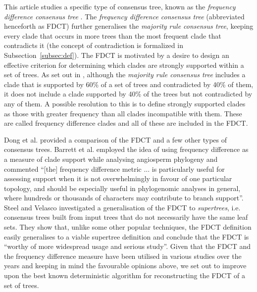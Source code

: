 \documentclass{article}
\begin{document}
    This article studies a specific type of consensus tree, known as the \textit{frequency difference consensus tree} \cite{goloboff2003improvements}. The \textit{frequency difference consensus tree} (abbreviated henceforth as FDCT) further generalises the \textit{majority rule consensus tree}, keeping every clade that occurs in more trees than the most frequent clade that contradicts it (the concept of contradiction is formalized in Subsection~\ref{subsec:def}). The FDCT is motivated by a desire to design an effective criterion for determining which clades are strongly supported within a set of trees. As set out in \cite{goloboff2003improvements}, although the \textit{majority rule consensus tree} includes a clade that is supported by 60\% of a set of trees and contradicted by 40\% of them, it does not include a clade supported by 40\% of the trees but not contradicted by any of them. A possible resolution to this is to define strongly supported clades as those with greater frequency than all clades incompatible with them. These are called frequency difference clades and all of these are included in the FDCT.

    Dong et al. \cite{dong2010majority} provided a comparison of the FDCT and a few other types of consensus trees. Barrett et al. \cite{barrett2013plastid} employed the idea of using frequency difference as a measure of clade support while analysing angiosperm phylogeny and commented ``[the] frequency difference metric ... is particularly useful for assessing support when it is not overwhelmingly in favour of one particular topology, and should be especially useful in phylogenomic analyses in general, where hundreds or thousands of characters may contribute to branch support''. Steel and Velasco \cite{steel2014axiomatic} investigated a generalisation of the FDCT to \textit{supertrees}, i.e. consensus trees built from input trees that do not necessarily have the same leaf sets. They show that, unlike some other popular techniques, the FDCT definition easily generalises to a viable supertree definition and conclude that the FDCT is ``worthy of more widespread usage and serious study''. Given that the FDCT and the frequency difference measure have been utilised in various studies over the years \cite{garcia2014testing,barrett2013plastid,molineri2010cladistic,molineri2013phylogeny,molineri2015phylogeny,lindqvist2006molecular,han2014new} and keeping in mind the favourable opinions above, we set out to improve upon the best known deterministic algorithm for reconstructing the FDCT of a set of trees.
\end{document}
